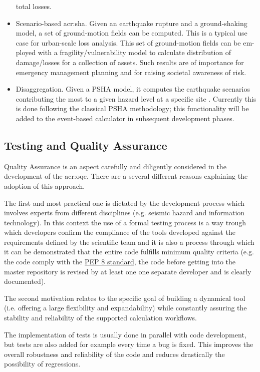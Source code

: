 \begin{itemize}
    total losses.
\item Scenario-based \gls{acr:sha}. Given an earthquake rupture and a 
    ground-shaking model, a set of ground-motion fields can be computed. 
    This is a typical use case for urban-scale loss analysis. This set of
    ground-motion fields can be em- ployed with a fragility/vulnerability 
    model to calculate distribution of damage/losses for a collection of
    assets. Such results are of importance for emergency management planning
    and for raising societal awareness of risk.
\item Disaggregation. Given a PSHA model, it computes the earthquake
    scenarios contributing the most to a given hazard level at a specific
    site \parencite{bazzurro1999}. Currently this is done following 
    the classical PSHA methodology; this functionality will be added to 
    the event-based calculator in subsequent development phases.
\end{itemize}
%
\subsection{Testing and Quality Assurance}
%
Quality Assurance is an aspect carefully and diligently considered 
in the development of the \gls{acr:oqe}. There are a several 
different reasons explaining the adoption of this approach.

The first and most practical one is dictated by the development 
process which involves experts from different disciplines (e.g. 
seismic hazard and information technology). 
%
In this context the use of a formal testing process is a way 
trough which developers confirm the compliance of the tools 
developed against the requirements defined by the scientific 
team and it is also a process through which it can be 
demonstrated that the entire code fulfills minimum quality 
criteria (e.g. the code comply with the
\href{http://legacy.python.org/dev/peps/pep-0008/}{PEP 8 standard}, 
the code before getting into the master repository is 
revised by at least one one separate developer and is 
clearly documented).
 
The second motivation relates to the specific goal of building 
a dynamical tool (i.e. offering a large flexibility and expandability) 
while constantly assuring the stability and reliability of 
the supported calculation workflows.

The implementation of tests is usually done in parallel with code 
development, but tests are also added for example every time a bug 
is fixed.
%
This improves the overall robustness and reliability of the code
and reduces drastically the possibility of regressions.

